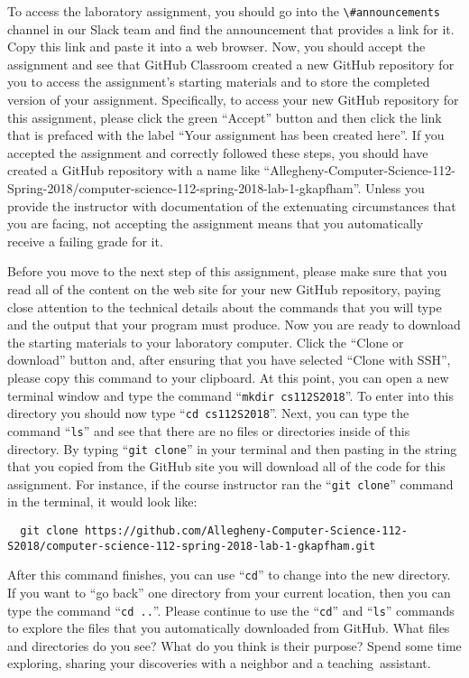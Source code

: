 \documentclass[11pt]{article}
\newcommand{\command}[1]{``\lstinline{#1}''}
\newcommand{\channel}[1]{\lstinline{#1}}
\newcommand{\step}[1]{``{#1}''}
\begin{document}
To access the laboratory assignment, you should go into the \channel{\#announcements} channel in our Slack team and find
the announcement that provides a link for it. Copy this link and paste it into a web browser. Now, you should accept the
assignment and see that GitHub Classroom created a new GitHub repository for you to access the assignment's starting
materials and to store the completed version of your assignment. Specifically, to access your new GitHub repository for
this assignment, please click the green ``Accept'' button and then click the link that is prefaced with the label ``Your
assignment has been created here''. If you accepted the assignment and correctly followed these steps, you should have
created a GitHub repository with a name like
``Allegheny-Computer-Science-112-Spring-2018/computer-science-112-spring-2018-lab-1-gkapfham''. Unless you provide the
instructor with documentation of the extenuating circumstances that you are facing, not accepting the assignment means
that you automatically receive a failing grade for it.

Before you move to the next step of this assignment, please make sure that you read all of the content on the web site
for your new GitHub repository, paying close attention to the technical details about the commands that you will type
and the output that your program must produce. Now you are ready to download the starting materials to your laboratory
computer. Click the ``Clone or download'' button and, after ensuring that you have selected ``Clone with SSH'', please
copy this command to your clipboard. At this point, you can open a new terminal window and type the command
\command{mkdir cs112S2018}. To enter into this directory you should now type \command{cd cs112S2018}. Next, you can type
the command \command{ls} and see that there are no files or directories inside of this directory. By typing \command{git
clone} in your terminal and then pasting in the string that you copied from the GitHub site you will download all of the
code for this assignment. For instance, if the course instructor ran the \command{git clone} command in the terminal, it
would look like:

\begin{lstlisting}
  git clone https://github.com/Allegheny-Computer-Science-112-S2018/computer-science-112-spring-2018-lab-1-gkapfham.git
\end{lstlisting}

After this command finishes, you can use \command{cd} to change into the new directory. If you want to \step{go back}
one directory from your current location, then you can type the command \command{cd ..}. Please continue to use the
\command{cd} and \command{ls} commands to explore the files that you automatically downloaded from GitHub. What files
and directories do you see? What do you think is their purpose? Spend some time exploring, sharing your discoveries with
a neighbor and a \mbox{teaching assistant}.
\end{document}
